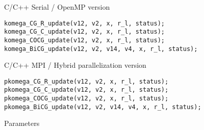 \documentclass[12pt,titlepage]{article}
\begin{document}
\noindent C/C++ Serial / OpenMP version

\begin{verbatim}
komega_CG_R_update(v12, v2, x, r_l, status);
komega_CG_C_update(v12, v2, x, r_l, status);
komega_COCG_update(v12, v2, x, r_l, status);
komega_BiCG_update(v12, v2, v14, v4, x, r_l, status);
\end{verbatim}

\noindent C/C++ MPI / Hybrid parallelization version
\begin{verbatim}
pkomega_CG_R_update(v12, v2, x, r_l, status);
pkomega_CG_C_update(v12, v2, x, r_l, status);
pkomega_COCG_update(v12, v2, x, r_l, status);
pkomega_BiCG_update(v12, v2, v14, v4, x, r_l, status);
\end{verbatim}

\noindent Parameters
\end{document}
